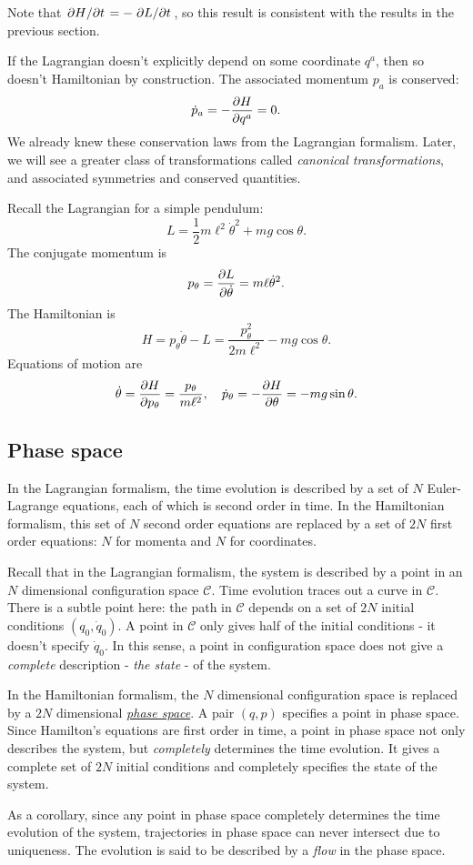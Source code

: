 \documentclass{article}
\begin{document}
Note that $ \pdv*{H}{t} = -\pdv*{L}{t} $, so this result is consistent with the results in the previous section.
\par
If the Lagrangian doesn't explicitly depend on some coordinate $ q^{a} $, then so doesn't Hamiltonian by construction. The associated momentum $ p_{a} $ is conserved:
\begin{equation}
	\dot{p}_{a} = -\pdv{H}{q^{a}} = 0.
\end{equation}
We already knew these conservation laws from the Lagrangian formalism. Later, we will see a greater class of transformations called \textit{canonical transformations}, and associated symmetries and conserved quantities. 
\begin{example}
	Recall the Lagrangian for a simple pendulum:
	\[
		L = \frac{1}{2} m \ell^{2} \dot{\theta}^{2} + mg \cos \theta.
	\]
	The conjugate momentum is
	\[
		p_{\theta} = \pdv{L}{\dot{\theta}} = m \ell \dot{\theta}^{2}.
	\]
	The Hamiltonian is
	\[
		H = p_{\theta} \dot{\theta} - L = \frac{p_{\theta}^{2}}{2m\ell^{2}} - mg\cos\theta.
	\]
	Equations of motion are
	\[
		\dot{\theta} = \pdv{H}{p_{\theta}} = \frac{p_{\theta}}{m \ell ^{2}} , \quad \dot{p}_{\theta} = - \pdv{H}{\theta} = - m g \sin \theta.
	\]
\end{example}
\subsection{Phase space}
In the Lagrangian formalism, the time evolution is described by a set of $ N $ Euler-Lagrange equations, each of which is second order in time. In the Hamiltonian formalism, this set of $ N $ second order equations are replaced by a set of $ 2N $ first order equations: $ N  $ for momenta and $ N $ for coordinates. 
\par
Recall that in the Lagrangian formalism, the system is described by a point in an $ N $ dimensional configuration space $ \mathcal{C} $. Time evolution traces out a curve in $ \mathcal{C} $. There is a subtle point here: the path in $ \mathcal{C} $ depends on a set of $ 2N $ initial conditions $ (q_{0}, \dot{q}_{0}) $. A point in $ \mathcal{C} $ only gives half of the initial conditions - it doesn't specify $ \dot{q}_{0} $. In this sense, a point in configuration space does not give a \textit{complete} description - \textit{the state} - of the system.
\par
In the Hamiltonian formalism, the $ N $ dimensional configuration space is replaced by a $ 2N $ dimensional \href{https://en.wikipedia.org/wiki/Phase_space}{\textit{phase space}}. A pair $ (q,p) $ specifies a point in phase space. Since Hamilton's equations are first order in time, a point in phase space not only describes the system, but \textit{completely} determines the time evolution. It gives a complete set of $ 2N $ initial conditions and completely specifies the state of the system. 
\par
As a corollary, since any point in phase space completely determines the time evolution of the system, trajectories in phase space can never intersect due to uniqueness. The evolution is said to be described by a \textit{flow} in the phase space.
\end{document}
